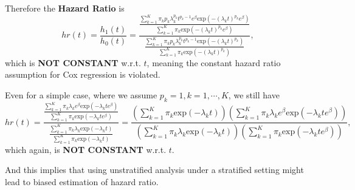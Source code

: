 \documentclass[a4paper,12pt]{article}
\begin{document}
Therefore the \textbf{Hazard Ratio} is
\begin{equation}
  \label{eq:marginal_hr}
  hr\left(t\right) = \frac{h_1\left(t\right)}{h_0\left(t\right)}
  = \frac{
    \frac{
      \sum\limits_{k = 1}^K\pi_k
      p_k\lambda_k^{p_k}t^{p_k - 1}e^\beta
      \mathrm{exp}\left(-\left(\lambda_kt\right)^{p_k}e^\beta\right)
    }{
      \sum\limits_{k = 1}^K\pi_k
      \mathrm{exp}\left(-\left(\lambda_kt\right)^{p_k}e^\beta\right)
    }
  }{
    \frac{
      \sum\limits_{k = 1}^K\pi_k
      p_k\lambda_k^{p_k}t^{p_k - 1}
      \mathrm{exp}\left(-\left(\lambda_kt\right)^{p_k}\right)
    }{
      \sum\limits_{k = 1}^K\pi_k
      \mathrm{exp}\left(-\left(\lambda_kt\right)^{p_k}\right)
    }
  }, 
\end{equation}
which is \textbf{NOT CONSTANT} w.r.t. $t$, meaning the constant hazard ratio assumption for Cox regression is violated.
\par
Even for a simple case, where we assume $p_k = 1, k = 1, \cdots, K$, we still have
\begin{equation}
  \label{eq:marginal_hr_exponential}
  hr(t) = \frac{
    \frac{
      \sum\limits_{k = 1}^K\pi_k
      \lambda_ke^\beta
      \mathrm{exp}\left(-\lambda_kte^\beta\right)
    }{
      \sum\limits_{k = 1}^K\pi_k
      \mathrm{exp}\left(-\lambda_kte^\beta\right)
    }
  }{
    \frac{
      \sum\limits_{k = 1}^K\pi_k
      \lambda_k
      \mathrm{exp}\left(- \lambda_kt\right)
    }{
      \sum\limits_{k = 1}^K\pi_k
      \mathrm{exp}\left(-\lambda_kt\right)
    }
  }
  = \frac{
    \left(
      \sum\limits_{k = 1}^K\pi_k
      \mathrm{exp}\left(-\lambda_kt\right)
    \right)
    \left(
      \sum\limits_{k = 1}^K\pi_k
      \lambda_ke^\beta
      \mathrm{exp}\left(-\lambda_kte^\beta\right)
    \right)
  }{
    \left(
      \sum\limits_{k = 1}^K\pi_k
      \lambda_k
      \mathrm{exp}\left(- \lambda_kt\right)
    \right)
    \left(
      \sum\limits_{k = 1}^K\pi_k
      \mathrm{exp}\left(-\lambda_kte^\beta\right)
    \right)
  }, 
\end{equation}
which again, is \textbf{NOT CONSTANT} w.r.t. $t$.
\par
And this implies that using unstratified analysis under a stratified setting might lead to {\color{red} biased} estimation of hazard ratio. 



\end{document}
